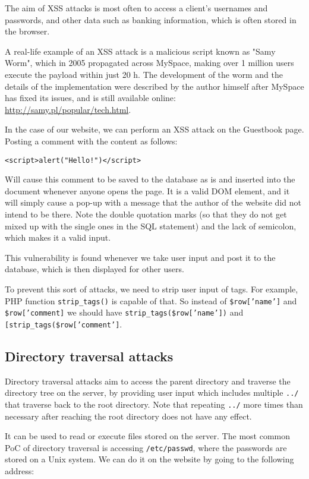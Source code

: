 \documentclass[11pt,journal]{article}
\begin{document}
	The aim of XSS attacks is most often to access a client's usernames and passwords, and other data such as banking information, which is often stored in the browser.
	
	A real-life example of an XSS attack is a malicious script known as "Samy Worm", which in 2005 propagated across MySpace, making over 1 million users execute the payload within just 20 h. The  development of the worm and the details of the implementation were described by the author himself after MySpace has fixed its issues, and is still available online: \url{http://samy.pl/popular/tech.html}.
	
	In the case of our website, we can perform an XSS attack on the Guestbook page. Posting a comment with the content as follows:
	
	\texttt{<script>alert("Hello!")</script>}
	
	Will cause this comment to be saved to the database as is and inserted into the document whenever anyone opens the page. It is a valid DOM element, and it will simply cause a pop-up with a message that the author of the website did not intend to be there. Note the double quotation marks (so that they do not get mixed up with the single ones in the SQL statement) and the lack of semicolon, which makes it a valid input.
	
	This vulnerability is found whenever we take user input and post it to the database, which is then displayed for other users.
	
	To prevent this sort of attacks, we need to strip user input of tags. For example, PHP function \texttt{strip\_tags()} is capable of that. So instead of \texttt{\$row['name']} and \texttt{\$row['comment]} we should have \texttt{strip\_tags(\$row['name'])} and \texttt{[strip\_tags(\$row['comment']}.
	
	\subsection{Directory traversal attacks}
	Directory traversal attacks aim to access the parent directory and traverse the directory tree on the server, by providing user input which includes multiple \texttt{../} that traverse back to the root directory. Note that repeating \texttt{../} more times than necessary after reaching the root directory does not have any effect.
	
	It can be used to read or execute files stored on the server. The most common PoC of directory traversal is accessing \texttt{/etc/passwd}, where the passwords are stored on a Unix system. We can do it on the website by going to the following address:
	
\end{document}
